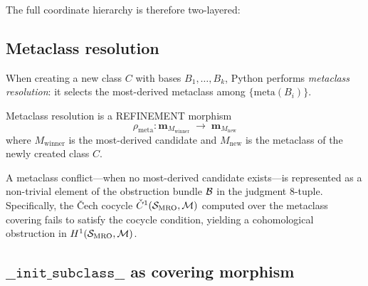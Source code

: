 \documentclass[11pt]{article}
\newcommand{\MROSite}{\mathcal{S}_{\mathrm{MRO}}} %
\newcommand{\MetaCoord}[1]{\mathbf{m}_{#1}}       %
\newcommand{\initsubclass}{\texttt{\_\_init\_subclass\_\_}}
\begin{document}
The full coordinate hierarchy is therefore two-layered:
\begin{center}
\end{center}

\subsection{Metaclass resolution}

When creating a new class $C$ with bases $B_1, \ldots, B_k$, Python
performs \emph{metaclass resolution}: it selects the most-derived
metaclass among $\{\mathrm{meta}(B_i)\}$.

\begin{definition}\label{def:meta-res}
  Metaclass resolution is a REFINEMENT morphism
  \[
    \rho_{\mathrm{meta}}\colon
    \MetaCoord{M_{\mathrm{winner}}} \;\longrightarrow\; \MetaCoord{M_{\mathrm{new}}}
  \]
  where $M_{\mathrm{winner}}$ is the most-derived candidate and
  $M_{\mathrm{new}}$ is the metaclass of the newly created class $C$.
\end{definition}

\begin{proposition}\label{prop:meta-conflict}
  A metaclass conflict---when no most-derived candidate exists---is
  represented as a non-trivial element of the obstruction bundle
  $\mathcal{B}$ in the judgment 8-tuple.  Specifically, the Čech cocycle
  $\Cech^1(\MROSite, \mathcal{M})$ computed over the metaclass
  covering fails to satisfy the cocycle condition, yielding a
  cohomological obstruction in $\Hcoh{1}(\MROSite, \mathcal{M})$.
\end{proposition}

\subsection{$\initsubclass$ as covering morphism}
\end{document}
